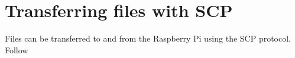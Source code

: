 \documentclass{article}
\begin{document}
\section{Transferring files with SCP}

Files can be transferred to and from the Raspberry Pi using the SCP protocol. Follow 






	
	







\end{document}
